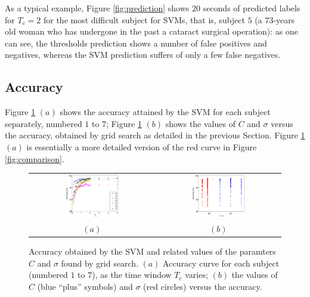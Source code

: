 \documentclass[a4paper,10pt,conference]{ieeeconf}
\begin{document}
As a typical example, Figure \ref{fig:prediction} shows $20$ seconds
of predicted labels for $T_c=2$ for the most difficult subject for
SVMs, that is, subject $5$ (a 73-years old woman who has undergone in
the past a cataract surgical operation): as one can see, the
thresholds prediction shows a number of false positives and negatives,
whereas the SVM prediction suffers of only a few false negatives.

\subsection{Accuracy}
\label{subsec:accuracy}

Figure \ref{fig:accuracy} $(a)$ shows the accuracy attained by the SVM
for each subject separately, numbered $1$ to $7$; Figure
\ref{fig:accuracy} $(b)$ shows the values of $C$ and $\sigma$ versus
the accuracy, obtained by grid search as detailed in the previous
Section. Figure \ref{fig:accuracy} $(a)$ is essentially a more
detailed version of the red curve in Figure \ref{fig:comparison}.

\begin{figure}[ht]
  \begin{center}
    \begin{tabular}{cc}
      \includegraphics[width=0.45\textwidth]{accuracy.eps} &
      \includegraphics[width=0.45\textwidth]{hyperparams.eps} \\
      $(a)$ & $(b)$
    \end{tabular}
    \caption{Accuracy obtained by the SVM and related values of the
    paramters $C$ and $\sigma$ found by grid search. $(a)$ Accuracy
    curve for each subject (numbered $1$ to $7$), as the time window
    $T_c$ varies; $(b)$ the values of $C$ (blue ``plus'' symbols) and
    $\sigma$ (red circles) versus the accuracy.}
    \label{fig:accuracy}
  \end{center}
\end{figure}
\end{document}
